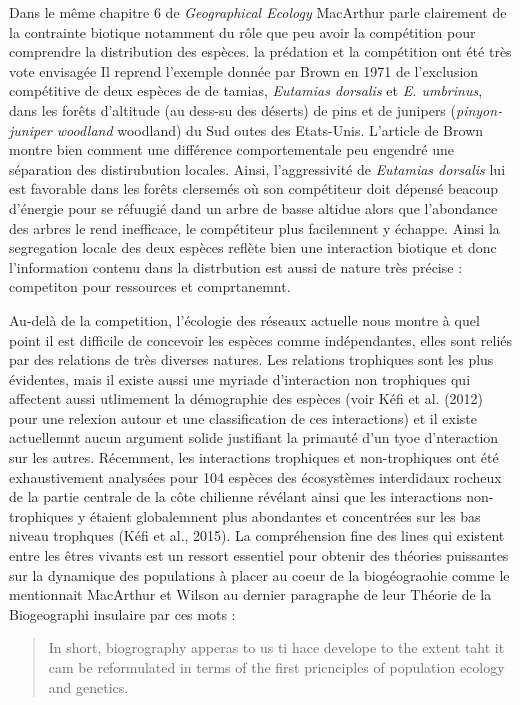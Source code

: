 Dans le même chapitre 6 de \emph{Geographical Ecology} MacArthur parle
clairement de la contrainte biotique notamment du rôle que peu avoir la
compétition pour comprendre la distribution des espèces. la prédation et
la compétition ont été très vote envisagée Il reprend l'exemple donnée
par Brown en 1971 de l'exclusion compétitive de deux espèces de de
tamias, \emph{Eutamias dorsalis} et \emph{E. umbrinus}, dans les forêts
d'altitude (au dess-su des déserts) de pins et de junipers
(\emph{pinyon-juniper woodland} woodland) du Sud outes des Etats-Unis.
L'article de Brown montre bien comment une différence comportementale
peu engendré une séparation des distirubution locales. Ainsi,
l'aggressivité de \emph{Eutamias dorsalis} lui est favorable dans les
forêts clersemés où son compétiteur doit dépensé beacoup d'énergie pour
se réfuugié dand un arbre de basse altidue alors que l'abondance des
arbres le rend inefficace, le compétiteur plus facilemnent y échappe.
Ainsi la segregation locale des deux espèces reflète bien une
interaction biotique et donc l'information contenu dans la distrbution
est aussi de nature très précise : competiton pour ressources et
comprtanemnt.

Au-delà de la competition, l'écologie des réseaux actuelle nous montre à
quel point il est difficile de concevoir les espèces comme
indépendantes, elles sont reliés par des relations de très diverses
natures. Les relations trophiques sont les plus évidentes, mais il
existe aussi une myriade d'interaction non trophiques qui affectent
aussi utlimement la démographie des espèces (voir Kéfi et al. (2012)
pour une relexion autour et une classification de ces interactions) et
il existe actuellemnt aucun argument solide justifiant la primauté d'un
tyoe d'nteraction sur les autres. Récemment, les interactions trophiques
et non-trophiques ont été exhaustivement analysées pour 104 espèces des
écosystèmes interdidaux rocheux de la partie centrale de la côte
chilienne révélant ainsi que les interactions non-trophiques y étaient
globalemnent plus abondantes et concentrées sur les bas niveau trophques
(Kéfi et al., 2015). La compréhension fine des lines qui existent entre
les êtres vivants est un ressort essentiel pour obtenir des théories
puissantes sur la dynamique des populations à placer au coeur de la
biogéograohie comme le mentionnait MacArthur et Wilson au dernier
paragraphe de leur Théorie de la Biogeographi insulaire par ces mots :

\begin{quote}
\guillemotleft In short, biogrography apperas to us ti hace develope to
the extent taht it cam be reformulated in terms of the first pricnciples
of population ecology and genetics. \guillemotright
\end{quote}

